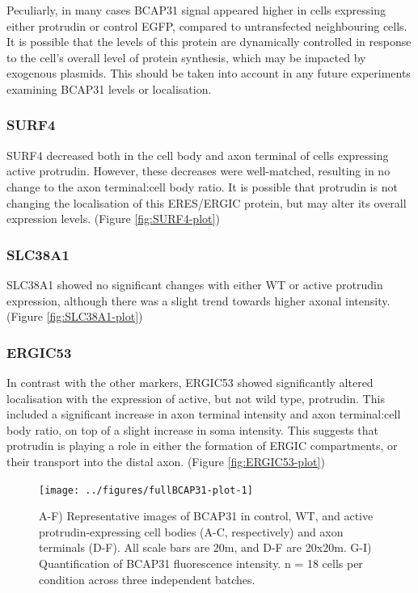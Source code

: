 \documentclass[
  12pt,
  a4paper,
]{book}
\begin{document}
Peculiarly, in many cases BCAP31 signal appeared higher in cells expressing either protrudin or control EGFP, compared to untransfected neighbouring cells. It is possible that the levels of this protein are dynamically controlled in response to the cell's overall level of protein synthesis, which may be impacted by exogenous plasmids. This should be taken into account in any future experiments examining BCAP31 levels or localisation.

\hypertarget{surf4}{%
\subsubsection{SURF4}\label{surf4}}

SURF4 decreased both in the cell body and axon terminal of cells expressing active protrudin. However, these decreases were well-matched, resulting in no change to the axon terminal:cell body ratio. It is possible that protrudin is not changing the localisation of this ERES/ERGIC protein, but may alter its overall expression levels. (Figure \ref{fig:SURF4-plot})

\hypertarget{slc38a1}{%
\subsubsection{SLC38A1}\label{slc38a1}}

SLC38A1 showed no significant changes with either WT or active protrudin expression, although there was a slight trend towards higher axonal intensity. (Figure \ref{fig:SLC38A1-plot})

\hypertarget{ergic53}{%
\subsubsection{ERGIC53}\label{ergic53}}

In contrast with the other markers, ERGIC53 showed significantly altered localisation with the expression of active, but not wild type, protrudin. This included a significant increase in axon terminal intensity and axon terminal:cell body ratio, on top of a slight increase in soma intensity. This suggests that protrudin is playing a role in either the formation of ERGIC compartments, or their transport into the distal axon. (Figure \ref{fig:ERGIC53-plot})

\begin{figure}
\texttt{[image: ../figures/fullBCAP31-plot-1]} \caption[BCAP31 localisation in protrudin-expressing neurons]{A-F) Representative images of BCAP31 in control, WT, and active protrudin-expressing cell bodies (A-C, respectively) and axon terminals (D-F).  All scale bars are 20\textmu{}m, and D-F are 20x20\textmu{}m.  G-I) Quantification of BCAP31 fluorescence intensity. n = 18 cells per condition across three independent batches.}\label{fig:BCAP31-plot}
\end{figure}
\end{document}
